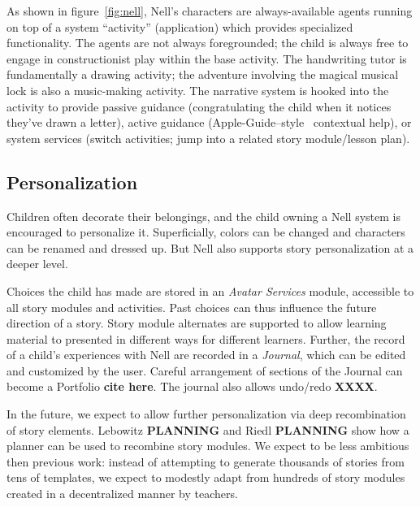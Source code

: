 \documentclass{acm_proc_article-sp}
\begin{document}
As shown in figure~\ref{fig:nell}, Nell's characters are
always-available agents running on top of a system ``activity''
(application) which provides specialized functionality.  The agents
are not always foregrounded; the child is always free to engage in
constructionist play within the base activity.  The handwriting tutor is
fundamentally a drawing activity; the adventure involving the magical
musical lock is also a music-making activity.  The narrative system is
hooked into the activity to provide passive guidance
(congratulating the child when it notices they've drawn a letter),
active guidance (Apple-Guide--style~\cite{powers:appleguide}
contextual help), or system services (switch activities; jump into a
related story module/lesson plan).


\subsection{Personalization}

Children often decorate their belongings, and the
child owning a Nell system is encouraged to personalize it.
Superficially, colors can be changed and characters can be renamed and
dressed up.  But Nell also supports story personalization at a deeper
level.

Choices the child has made are stored in an \textit{Avatar Services}
module, accessible to all story modules and activities.  Past choices
can thus influence the future direction of a story.  Story module
alternates are supported to allow learning material to presented in
different ways for different learners. Further, the record of a
child's experiences with Nell are recorded in a \textit{Journal},
which can be edited and customized by the user.  Careful arrangement
of sections of the Journal can become a Portfolio \textbf{cite here}.
The journal also allows undo/redo \textbf{XXXX}.

In the future, we expect to allow further personalization via deep
recombination of story elements.  Lebowitz \textbf{PLANNING} and Riedl
\textbf{PLANNING} show how a planner can be used to recombine story
modules.  We expect to be less ambitious then previous work: instead
of attempting to generate thousands of stories from tens of templates,
we expect to modestly adapt from hundreds of story modules created
in a decentralized manner by teachers.
\end{document}
